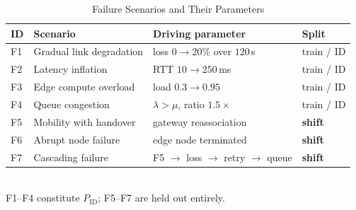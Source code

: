 \begin{table}[!t]
\caption{Failure Scenarios and Their Parameters}
\label{tab:scenarios}
\centering
\footnotesize
\setlength{\tabcolsep}{3.5pt}
\begin{tabular}{@{}llll@{}}
\toprule
ID & Scenario & Driving parameter & Split \\
\midrule
F1 & Gradual link degradation & loss $0\to20\%$ over $120$\,s      & train / ID \\
F2 & Latency inflation        & RTT $10\to250$\,ms                 & train / ID \\
F3 & Edge compute overload    & load $0.3\to0.95$                  & train / ID \\
F4 & Queue congestion         & $\lambda>\mu$, ratio $1.5\times$   & train / ID \\
F5 & Mobility with handover   & gateway reassociation              & \textbf{shift} \\
F6 & Abrupt node failure      & edge node terminated               & \textbf{shift} \\
F7 & Cascading failure        & F5 $\to$ loss $\to$ retry $\to$ queue & \textbf{shift} \\
\bottomrule
\end{tabular}
\\[2pt]
{\footnotesize F1--F4 constitute $P_{\mathrm{ID}}$; F5--F7 are held out entirely.}
\end{table}

